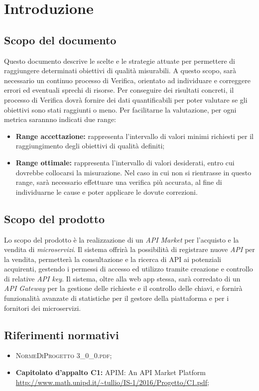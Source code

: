 \newpage
\section{Introduzione}

\subsection{Scopo del documento}
Questo documento descrive le scelte e le strategie attuate per permettere di raggiungere determinati obiettivi di qualità misurabili. A questo scopo, sarà necessario un continuo processo di Verifica, orientato ad individuare e correggere errori ed eventuali sprechi di risorse.
Per conseguire dei risultati concreti, il processo di Verifica dovrà fornire dei dati quantificabili per poter valutare se gli obiettivi sono stati raggiunti o meno. Per facilitarne la valutazione, per ogni metrica sarannno indicati due range:
\begin{itemize}
	\item \textbf{Range accettazione:} rappresenta l'intervallo di valori minimi richiesti per il raggiungimento degli obiettivi di qualità definiti;
	\item \textbf{Range ottimale:} rappresenta l'intervallo di valori desiderati, entro cui dovrebbe collocarsi la misurazione. Nel caso in cui non si rientrasse in questo range, sarà necessario effettuare una verifica più accurata, al fine di individuarne le cause e poter applicare le dovute correzioni.
\end{itemize}

\subsection{Scopo del prodotto}
Lo scopo del prodotto è la realizzazione di un \textit{API Market} per l'acquisto e la vendita di \textit{microservizi}. Il sistema offrirà la possibilità di registrare nuove \textit{API} per la vendita, permetterà la consultazione e la ricerca di API ai potenziali acquirenti, gestendo i permessi di accesso ed utilizzo tramite creazione e controllo di relative \textit{API key}. Il sistema, oltre alla web app stessa, sarà corredato di un \textit{API Gateway} per la gestione delle richieste e il controllo delle chiavi, e fornirà funzionalità avanzate di statistiche per il gestore della piattaforma e per i fornitori dei microservizi.

\subsection{Riferimenti normativi}
\begin{itemize}
\item \textsc{NormeDiProgetto 3\_0\_0.pdf};
\item \textbf{Capitolato d’appalto C1:} APIM: An API Market Platform\\ \url{http://www.math.unipd.it/~tullio/IS-1/2016/Progetto/C1.pdf};
\end{itemize}

